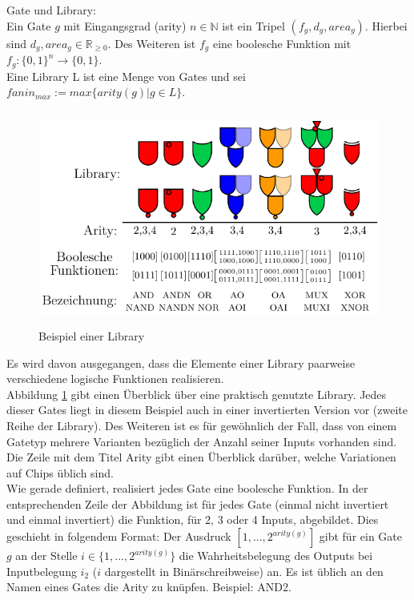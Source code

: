 \documentclass[11pt, a4paper, german]{article}
\begin{document}
\begin{definition}{Gate und Library:}\label{def:gate}\\
Ein Gate $g$ mit Eingangsgrad (arity) $ n \in \mathbb{N}$ ist ein Tripel $(f_g, d_g, area_g)$. Hierbei sind $d_g, area_g \in \mathbb{R}_{\geq 0}$. Des Weiteren ist $f_g$ eine boolesche Funktion mit $ f_g : \{0,1\}^n \rightarrow \{0, 1\} $. \\
Eine Library L ist eine Menge von Gates und sei \\ 
$fanin_{max} := max\{ arity(g) | g \in L \}$.
\end{definition}
\begin{figure}[h]
\begin{center}
 \includegraphics[height = 200pt]{./pictures/compiled/new_library.pdf}
 \caption{Beispiel einer Library}
 \label{bild:new_library}
\end{center}
\end{figure}
Es wird davon ausgegangen, dass die Elemente einer Library paarweise verschiedene logische Funktionen realisieren. \\
Abbildung \ref{bild:new_library} gibt einen Überblick über eine praktisch genutzte Library. Jedes dieser Gates liegt in diesem Beispiel auch in einer invertierten Version vor (zweite Reihe der Library). Des Weiteren ist es für gewöhnlich der Fall, dass von einem Gatetyp mehrere Varianten bezüglich der Anzahl seiner Inputs vorhanden sind. Die Zeile mit dem Titel Arity gibt einen Überblick darüber, welche Variationen auf Chips üblich sind.\\
Wie gerade definiert, realisiert jedes Gate eine boolesche Funktion. In der entsprechenden Zeile der Abbildung ist für jedes Gate (einmal nicht invertiert und einmal invertiert) die  Funktion, für 2, 3 oder 4 Inputs, abgebildet. Dies geschieht in folgendem Format: Der Ausdruck $[1,...,2^{arity(g)} ]$ gibt für ein Gate $g$ an der Stelle $i \in \{1,...,2^{arity(g)}\}$ die Wahrheitsbelegung des Outputs bei Inputbelegung $i_2$ ($i$ dargestellt in Binärschreibweise) an. Es ist üblich an den Namen eines Gates die Arity zu knüpfen. Beispiel: AND2. \\
\end{document}
